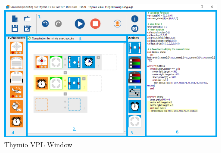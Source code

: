 \documentclass{scrartcl}
\begin{document}
\begin{figure}[h!]
  \includegraphics[width=\textwidth]{./VPL/Thymio_VPL_window}
  \caption{Thymio VPL Window}
  \label{fig:thymio_vpl_window}
\end{figure}
\end{document}
